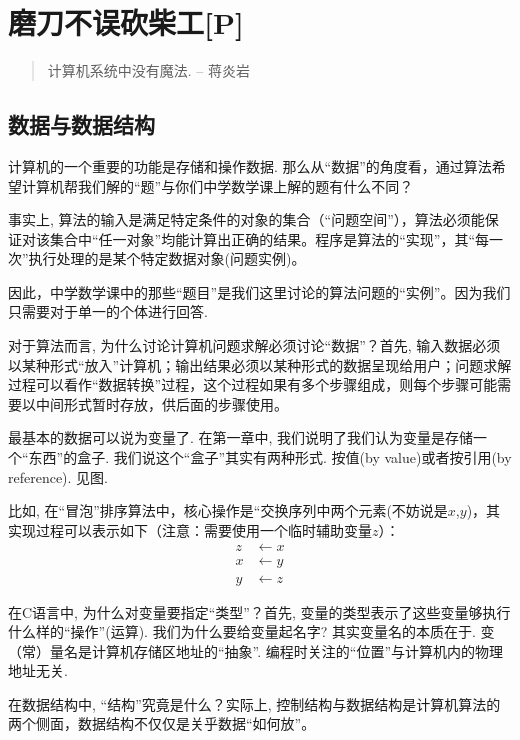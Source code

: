 \chapter{磨刀不误砍柴工[P]}
\begin{quote}
	计算机系统中没有魔法. \hfill -- 蒋炎岩
\end{quote}



\section{数据与数据结构}


计算机的一个重要的功能是存储和操作数据. 那么从“数据”的角度看，通过算法希望计算机帮我们解的“题”与你们中学数学课上解的题有什么不同？

事实上, 算法的输入是满足特定条件的对象的集合（“问题空间”），算法必须能保证对该集合中“任一对象”均能计算出正确的结果。程序是算法的“实现”，其“每一次”执行处理的是某个特定数据对象(问题实例)。

因此，中学数学课中的那些“题目”是我们这里讨论的算法问题的“实例”。因为我们只需要对于单一的个体进行回答. 

对于算法而言, 为什么讨论计算机问题求解必须讨论“数据”？首先, 输入数据必须以某种形式“放入”计算机；输出结果必须以某种形式的数据呈现给用户；问题求解过程可以看作“数据转换”过程，这个过程如果有多个步骤组成，则每个步骤可能需要以中间形式暂时存放，供后面的步骤使用。

最基本的数据可以说为变量了. 在第一章中, 我们说明了我们认为变量是存储一个``东西''的盒子. 我们说这个``盒子''其实有两种形式. 按值(by value)或者按引用(by reference). 见图. 


比如, 在“冒泡”排序算法中，核心操作是“交换序列中两个元素(不妨说是$x$,$y$)，其实现过程可以表示如下（注意：需要使用一个临时辅助变量$z$）：
$$
\begin{aligned}
z&\leftarrow x\\
x&\leftarrow y\\
y&\leftarrow z	
\end{aligned}
$$

在C语言中, 为什么对变量要指定“类型”？首先, 变量的类型表示了这些变量够执行什么样的“操作”(运算). 我们为什么要给变量起名字? 其实变量名的本质在于. 变（常）量名是计算机存储区地址的“抽象”. 编程时关注的“位置”与计算机内的物理地址无关.

在数据结构中, “结构”究竟是什么？实际上, 控制结构与数据结构是计算机算法的两个侧面，数据结构不仅仅是关乎数据“如何放”。

